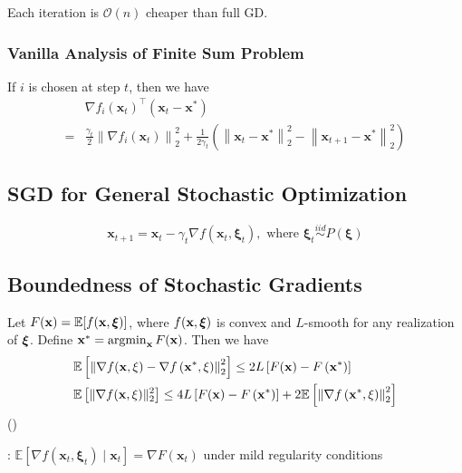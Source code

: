 Each iteration is $\mathcal{O}(n)$ cheaper than full GD.


\subsubsection*{Vanilla Analysis of Finite Sum Problem}
If $i$ is chosen at step $t$, then we have
$$
\begin{aligned}
&\nabla {f}_{{i}}\left(\mathbf{x}_{{t}}\right)^{\top}\left(\mathbf{x}_{{t}}-\mathbf{x}^{*}\right) \\
=&\frac{\gamma_{{t}}}{2}\left\|\nabla {f}_{{i}}\left(\mathbf{x}_{{t}}\right)\right\|_{2}^{2}+\frac{1}{2 \gamma_{{t}}}\left(\left\|\mathbf{x}_{{t}}-\mathbf{x}^{*}\right\|_{2}^{2}-\left\|\mathbf{x}_{{t}+1}-\mathbf{x}^{*}\right\|_{2}^{2}\right)
\end{aligned}
$$


\subsection*{SGD for General Stochastic Optimization}
$$
\mathbf{x}_{t+1}=\mathbf{x}_{t}-\gamma_{t} \nabla f\left(\mathbf{x}_{t}, \boldsymbol{\xi}_{t}\right), \text { where } \boldsymbol{\xi}_{t} \stackrel{i i d}{\sim} P(\boldsymbol{\xi})
$$


\subsection*{Boundedness of Stochastic Gradients}
Let $F(\operatorname{\boldsymbol{\mathbf{x}}})=\mathbb{E}[f(\operatorname{\boldsymbol{\mathbf{x}}}, \boldsymbol{\mathbf{\xi}})]$, where $f(\operatorname{\boldsymbol{\mathbf{x}}}, \boldsymbol{\mathbf{\xi}})$ is convex and $L$-smooth for any realization of $\boldsymbol{\mathbf{\xi}}$. Define $\operatorname{\boldsymbol{\mathbf{x}}}^{*}=\operatorname{argmin}_{{\operatorname{\boldsymbol{\mathbf{x}}}}} {F}(\mathbf{x})$. Then we have 
$$
\begin{aligned}
&\mathbb{E}\left[\left\|\nabla f(\mathbf{x}, \xi)-\nabla f\left(\mathbf{x}^{*}, \xi\right)\right\|_{2}^{2}\right] \leq 2 {L}\left[{F}(\mathbf{x})-{F}\left(\mathbf{x}^{*}\right)\right] \\
&\mathbb{E}\left[\|\nabla f(\operatorname{\boldsymbol{\mathbf{x}}}, \xi)\|_{2}^{2}\right] \leq 4 {L}\left[{F}(\mathbf{x})-{F}\left({\operatorname{\boldsymbol{\mathbf{x}}}}^{*}\right)\right]+2 \mathbb{E}\left[\left\|\nabla f\left({\operatorname{\boldsymbol{\mathbf{x}}}}^{*}, \xi\right)\right\|_{2}^{2}\right]
\end{aligned}
$$
()



: $\mathbb{E}\left[\nabla f\left(\mathbf{x}_{t}, \boldsymbol{\xi}_{t}\right) \mid \mathbf{x}_{t}\right]=\nabla F\left(\mathbf{x}_{t}\right)$ under mild regularity conditions

